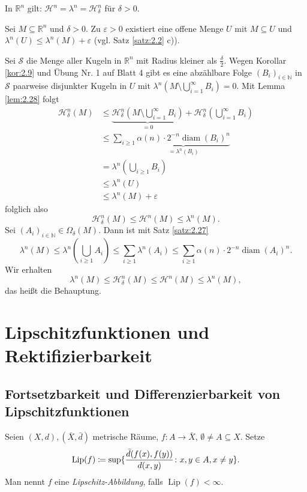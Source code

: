 \documentclass[a4paper,twoside,DIV15,BCOR12mm]{scrbook}
\newcommand{\HM}{\mathscr H}
\DeclareMathOperator{\diam}{diam}
\DeclareMathOperator{\Lip}{Lip}
\begin{document}
\begin{satz}
In \(\mathbb R^n\) gilt: \(\HM^n = \lambda^n = \HM^n_\delta\) für \(\delta > 0\).
\end{satz}
\begin{beweis}
Sei \(M \subseteq \mathbb R^n\) und $\delta>0$. Zu \(\varepsilon > 0\) existiert eine offene Menge \(U\) mit \(M \subseteq U\) und \(\lambda^n(U) \leq \lambda^n(M) + \varepsilon\) (vgl. Satz \ref{satz:2.2} c)).
\par
Sei \(\mathcal S\) die Menge aller Kugeln in \(\mathbb R^n\) mit Radius kleiner als \(\frac{\delta}2\). Wegen Korollar \ref{kor:2.9} und Übung Nr. 1 auf Blatt 4 gibt es eine abzählbare Folge \((B_i)_{i\in\mathbb N}\) in \(\mathcal S\) paarweise disjunkter Kugeln in \(U\) mit \(\lambda^n(M \setminus \bigcup_{i=1}^\infty B_i) = 0\). Mit Lemma \ref{lem:2.28} folgt
\begin{align*}
\HM^n_\delta(M) &\leq \underbrace{\HM^n_\delta(M\setminus \bigcup_{i=1}^\infty B_i)}_{=0} + \HM^n_\delta(\bigcup_{i=1}^\infty B_i) \\
&\leq \sum_{i\geq1} \underbrace{ \alpha(n) \cdot 2^{-n} \diam(B_i)^n }_{= \lambda^n(B_i)} \\
&= \lambda^n(\bigcup_{i\geq1} B_i) \\
&\leq \lambda^n(U) \\
&\leq \lambda^n(M) + \varepsilon
\end{align*}
folglich also
\[
\HM^n_\delta(M) \leq \HM^n(M) \leq \lambda^n(M).
\]
Sei \((A_i)_{i\in\mathbb N} \in \Omega_\delta(M)\). Dann ist mit Satz \ref{satz:2.27}
\[
\lambda^n(M) \leq \lambda^n(\bigcup_{i\geq1} A_i) \leq \sum_{i\geq1} \lambda^n(A_i) \leq \sum_{i\geq1} \alpha(n)\cdot 2^{-n} \diam(A_i)^n.
\]
Wir erhalten
\[
\lambda^n(M) \leq \HM^n_\delta(M) \leq \HM^n(M) \leq \lambda^n(M),
\]
das heißt die Behauptung.
\end{beweis}

\chapter{Lipschitzfunktionen und Rektifizierbarkeit}

\section{Fortsetzbarkeit und Differenzierbarkeit von Lipschitzfunktionen}

\begin{definition}
Seien \((X,d), (\bar X,\bar d)\) metrische Räume, \(f: A\rightarrow \bar X\), \(\emptyset \neq A \subseteq X\). 
Setze
\[
\Lip(f) \da \sup \{ \frac{\bar d(f(x),f(y))}{d(x,y)} \colon x,y \in A, x\neq y\}.
\]
Man nennt \(f\) eine \emph{Lipschitz-Abbildung}, falls \(\Lip(f) < \infty\).
\end{definition}
\end{document}
